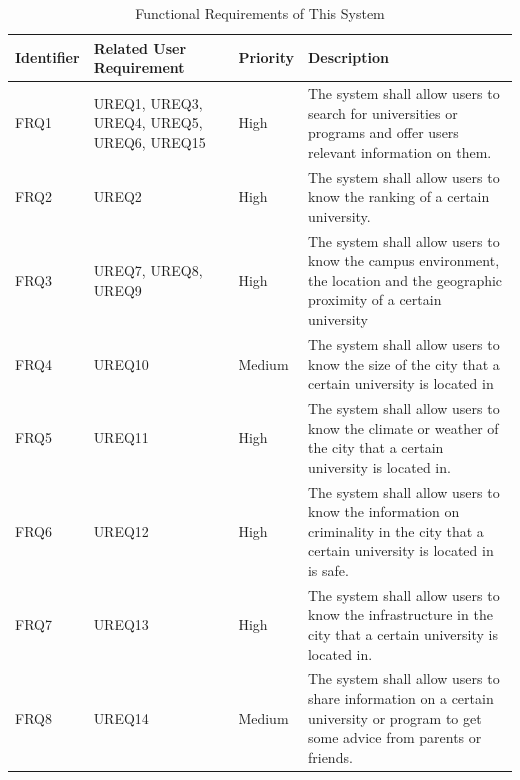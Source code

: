 \begin{table}[H]
\centering
\caption{Functional Requirements of This System
}
\label{my-label}
\begin{tabular}{|p{2cm}|p{3cm}|p{1.5cm}|p{7cm}|}
\hline
\textbf{Identifier} & \textbf{Related User Requirement}         & \textbf{Priority} & \textbf{Description}                                                                                                              \\ \hline
FRQ1                & UREQ1, UREQ3, UREQ4, UREQ5, UREQ6, UREQ15 & High              & The system shall allow users to search for universities or programs and offer users relevant information on them.                 \\ \hline
FRQ2                & UREQ2                                     & High              & The system shall allow users to know the ranking of a certain university.                                                         \\ \hline
FRQ3                & UREQ7, UREQ8, UREQ9                       & High              & The system shall allow users to know the campus environment, the location and the geographic proximity of a certain university    \\ \hline
FRQ4                & UREQ10                                    & Medium            & The system shall allow users to know the size of the city that a certain university is located in                                 \\ \hline
FRQ5                & UREQ11                                    & High              & The system shall allow users to know the climate or weather of the city that a certain university is located in.                  \\ \hline
FRQ6                & UREQ12                                    & High              & The system shall allow users to know the information  on criminality in the city that a certain university is located in is safe. \\ \hline
FRQ7                & UREQ13                                    & High              & The system shall allow users to know the infrastructure in the city that a certain university is located in.                      \\ \hline
FRQ8                & UREQ14                                    & Medium            & The system shall allow users to share information on a certain university or program to get some advice from parents or friends.  \\ \hline
\end{tabular}
\end{table}


